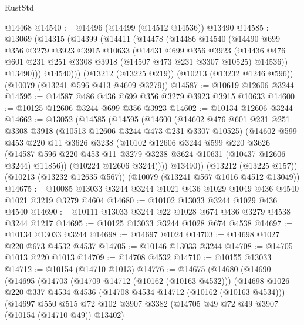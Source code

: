 \begin{lexlean}{RustStd}
\begin{coremodule}
{\begin{coremodule}
{{{{{{{{{{{{{{{{{{{{{{{{{{    @14468
@14540 := @14496 (@14499 (@14512 @14536)) @13490
@14585 := @13069
    (@14315
      (@14399
        (@14411
          (@14478
            (@14486
              @14540
              (@14490
                @699
                @356
                @3279
                @3923
                @3915
                @10633
                (@14431
                  @699
                  @356
                  @3923
                  (@14436 @476 @601 @231 @251 @3308 @3918 (@14507 @473 @231 @3307 @10525) @14536))
                @13490)))
          @14540)))
    (@13212 (@13225 @219))
    (@10213 (@13232 @1246 @596))
    (@10079 (@13241 @596 @413 @4609 @3279))
@14587 := @10619 @12606 @3244
@14595 := @14587 @486 @436 @699 @356 @3279 @3923 @3915 @10633
@14600 := @10125 @12606 @3244 @699 @356 @3923
@14602 := @10134 @12606 @3244
@14662 := @13052
    (@14585
      (@14595
        (@14600
          (@14602
            @476
            @601
            @231
            @251
            @3308
            @3918
            (@10513 @12606 @3244 @473 @231 @3307 @10525)
            (@14602
              @599
              @453
              @220
              @11
              @3626
              @3238
              (@10102
                @12606
                @3244
                @599
                @220
                @3626
                (@14587 @596 @220 @453 @11 @3279 @3238 @3624 @10631 (@10437 @12606 @3244) @11856))
              (@10224 @12606 @3244))))
        @13490))
    (@13212 (@13225 @157))
    (@10213 (@13232 @12635 @567))
    (@10079 (@13241 @567 @1016 @4512 @13049))
@14675 := @10085 @13033 @3244 @3244 @1021 @436 @1029 @1049 @436 @4540 @1021 @3219 @3279 @4604
@14680 := @10102 @13033 @3244 @1029 @436 @4540
@14690 := @10111 @13033 @3244 @22 @1028 @674 @436 @3279 @4538 @3244 @1217
@14695 := @10125 @13033 @3244 @1028 @674 @4538
@14697 := @10134 @13033 @3244
@14698 := @14697 @1024
@14703 := @14698 @1027 @220 @673 @4532 @4537
@14705 := @10146 @13033 @3244
@14708 := @14705 @1013 @220 @1013
@14709 := @14708 @4532
@14710 := @10155 @13033
@14712 := @10154 (@14710 @1013)
@14776 := @14675
    (@14680
      (@14690
        (@14695
          (@14703
            (@14709 @14712 (@10162 (@10163 @4532)))
            (@14698
              @1026
              @220
              @337
              @4534
              @4536
              (@14708 @4534 @14712 (@10162 (@10163 @4534)))
              (@14697
                @550
                @515
                @72
                @102
                @3907
                @3382
                (@14705 @49 @72 @49 @3907 (@10154 (@14710 @49)) @13402)
}}}}}}}}}}}}}}}}}}}}}}}}}}
\end{coremodule}}
\end{coremodule}
\end{lexlean}
